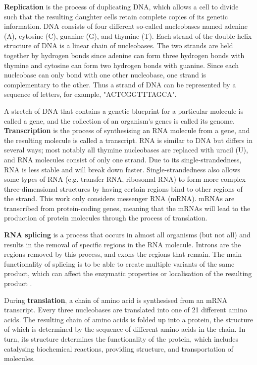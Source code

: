 \textbf{Replication} is the process of duplicating DNA, which allows a cell to divide such that the resulting daughter cells retain complete copies of its genetic information. DNA consists of four different so-called nucleobases named adenine (A), cytosine (C), guanine (G), and thymine (T). Each strand of the double helix structure of DNA is a linear chain of nucleobases. The two strands are held together by hydrogen bonds since adenine can form three hydrogen bonds with thymine and cytosine can form two hydrogen bonds with guanine. Since each nucleobase can only bond with one other nucleobase, one strand is complementary to the other. Thus a strand of DNA can be represented by a sequence of letters, for example, "ACTCGGTTTAGCA". %

A stretch of DNA that contains a genetic blueprint for a particular molecule is called a gene, and the collection of an organism's genes is called its genome. \textbf{Transcription} is the process of synthesising an RNA molecule from a gene, and the resulting molecule is called a transcript. RNA is similar to DNA but differs in several ways; most notably all thymine nucleobases are replaced with uracil (U), and RNA molecules consist of only one strand. Due to its single-strandedness, RNA is less stable and will break down faster. Single-strandedness also allows some types of RNA (e.g. transfer RNA, ribosomal RNA) to form more complex three-dimensional structures by having certain regions bind to other regions of the strand. This work only considers messenger RNA (mRNA). mRNAs are transcribed from protein-coding genes, meaning that the mRNAs will lead to the production of protein molecules through the process of translation. 

\textbf{RNA splicing} is a process that occurs in almost all organisms (but not all) and results in the removal of specific regions in the RNA molecule. Introns are the regions removed by this process, and exons the regions that remain. The main functionality of splicing is to be able to create multiple variants of the same product, which can affect the enzymatic properties or localisation of the resulting product \cite{kelemen_functionalternativesplicing_2013}.

During \textbf{translation}, a chain of amino acid is synthesised from an mRNA transcript. Every three nucleobases are translated into one of 21 different amino acids. The resulting chain of amino acids is folded up into a protein, the structure of which is determined by the sequence of different amino acids in the chain. In turn, its structure determines the functionality of the protein, which includes catalysing biochemical reactions, providing structure, and transportation of molecules. 
